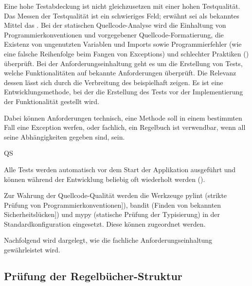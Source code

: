 Eine hohe Testabdeckung ist nicht gleichzusetzen mit einer hohen Testqualität.
Das Messen der Testqualität ist ein schwieriges Feld; erwähnt sei als bekanntes Mittel das .
Bei der statischen Quellcode-Analyse wird \zB die Einhaltung von Programmierkonventionen und vorgegebener Quellcode-Formatierung, die Existenz von ungenutzten Variablen und Imports sowie Programmierfehler (wie eine falsche Reihenfolge beim Fangen von Exceptions) und schlechter Praktiken () überprüft.
Bei der Anforderungseinhaltung geht es um die Erstellung von Tests, welche Funktionalitäten auf bekannte Anforderungen überprüft.
Die Relevanz dessen lässt sich \uA durch die Verbreitung des  beispielhaft zeigen.
Es ist eine Entwicklungsmethode, bei der die Erstellung des Tests vor der Implementierung der Funktionalität gestellt wird.
\parencites(\vgl)()[][Kapitel 8]{REALISIERUNG-Anaya2018}[][Kapitel 10]{PYTHON-Jaworski2021}

Dabei können Anforderungen technisch, \zB eine Methode soll in einem bestimmten Fall eine Exception werfen, oder fachlich, \zB ein Regelbuch ist verwendbar, wenn all seine Abhängigkeiten gegeben sind, sein.

\begin{enumerateWithCode}{QS}
    \setcounter{enumi}{2}

    \item Alle Tests werden automatisch vor dem Start der Applikation ausgeführt und können während der Entwicklung beliebig oft wiederholt werden (\vgl {}).

    \item Zur Wahrung der Quellcode-Qualität werden die Werkzeuge pylint (strikte Prüfung von Programmierkonventionen]), bandit (Finden von bekannten Sicherheitslücken]) und mypy (statische Prüfung der Typisierung) in der Standardkonfiguration eingesetzt.
    Diese können  zugeordnet werden.
\end{enumerateWithCode}

Nachfolgend wird dargelegt, wie die fachliche Anforderungseinhaltung gewährleistet wird.


\subsection{Prüfung der Regelbücher-Struktur}\label{subsec:pruefung-der-regelbuecher-struktur}

